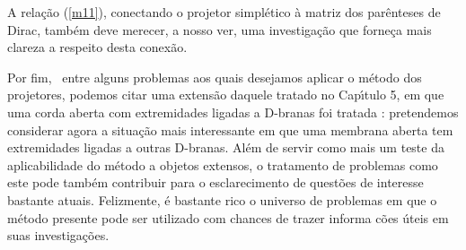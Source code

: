 \documentclass[a4paper,thmsa,12pt]{report}
\begin{document}
A rela\c{c}\~{a}o (\ref{m11}), conectando o projetor simpl\'{e}tico \`{a}
matriz dos par\^{e}nteses de Dirac, tamb\'{e}m deve merecer, a nosso ver,
uma investiga\c{c}\~{a}o que forne\c{c}a mais clareza a respeito desta
conex\~{a}o.

Por fim, \ entre alguns problemas aos quais desejamos aplicar o m\'{e}todo
dos projetores, podemos citar uma extens\~{a}o daquele tratado no
Cap\'{\i}tulo 5, em que uma corda aberta com extremidades ligadas a D-branas
foi tratada \cite{mmi}: pretendemos considerar agora a situa\c{c}\~{a}o mais
interessante em que uma membrana aberta tem extremidades ligadas a outras
D-branas. Al\'{e}m de servir como mais um teste da aplicabilidade do
m\'{e}todo a objetos extensos, o tratamento de problemas como este pode
tamb\'{e}m contribuir para o esclarecimento de quest\~{o}es de interesse
bastante atuais. Felizmente, \'{e} bastante rico o universo de problemas em
que o m\'{e}todo presente pode ser utilizado com chances de trazer informa\c{%
c}\~{o}es \'{u}teis em suas investiga\c{c}\~{o}es.
\end{document}
